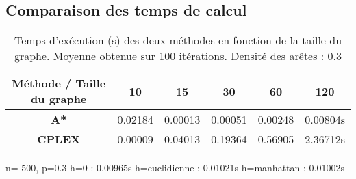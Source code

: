 \subsection{Comparaison des temps de calcul}
\begin{table}[H]
    \centering
    \begin{tabular}{|c|c|c|c|c|c|}
        \hline
        \textbf{Méthode / Taille du graphe} & 10 & 15 & 30 & 60 & 120 \\
        \hline
        \textbf{A*} & 0.02184 & 0.00013 & 0.00051 & 0.00248 & 0.00804s \\
        \hline
        \textbf{CPLEX} & 0.00009 & 0.04013 & 0.19364 & 0.56905 & 2.36712s \\
        \hline
    \end{tabular}
    \caption{Temps d'exécution (s) des deux méthodes en fonction de la taille du graphe. Moyenne obtenue sur 100 itérations. Densité des arêtes : 0.3}
\end{table}

n= 500, p=0.3
h=0 : 0.00965s
h=euclidienne : 0.01021s
h=manhattan : 0.01002s